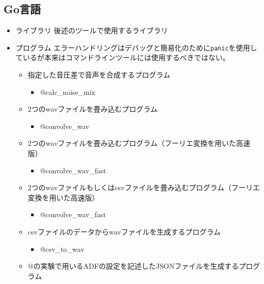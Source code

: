 \subsection{Go言語}\label{go}

\begin{itemize}
\item
  ライブラリ 後述のツールで使用するライブラリ
\item
  プログラム
  エラーハンドリングはデバッグと簡易化のために\texttt{panic}を使用しているが本来はコマンドラインツールには使用するべきではない。

  \begin{itemize}
  \tightlist
  \item
    指定した音圧差で音声を合成するプログラム

    \begin{itemize}
    \tightlist
    \item
      @calc\_noise\_mix
    \end{itemize}
  \item
    2つのwavファイルを畳み込むプログラム

    \begin{itemize}
    \tightlist
    \item
      @convolve\_wav
    \end{itemize}
  \item
    2つのwavファイルを畳み込むプログラム（フーリエ変換を用いた高速版）

    \begin{itemize}
    \tightlist
    \item
      @convolve\_wav\_fast
    \end{itemize}
  \item
    2つのwavファイルもしくはcsvファイルを畳み込むプログラム（フーリエ変換を用いた高速版）

    \begin{itemize}
    \tightlist
    \item
      @convolve\_wav\_fast
    \end{itemize}
  \item
    csvファイルのデータからwavファイルを生成するプログラム

    \begin{itemize}
    \tightlist
    \item
      @csv\_to\_wav
    \end{itemize}
  \item
    @の実験で用いるADFの設定を記述したJSONファイルを生成するプログラム


\end{itemize}
\end{itemize}
